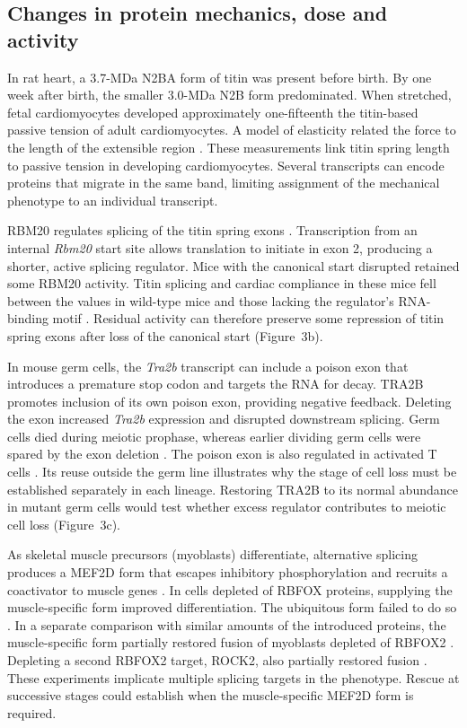 \documentclass[11pt,a4paper]{article}
\begin{document}
\subsection{Changes in protein mechanics, dose and activity}

In rat heart, a 3.7-MDa N2BA form of titin was present before birth. By one week after birth, the smaller 3.0-MDa N2B form predominated. When stretched, fetal cardiomyocytes developed approximately one-fifteenth the titin-based passive tension of adult cardiomyocytes. A model of elasticity related the force to the length of the extensible region \cite{Opitz2004}. These measurements link titin spring length to passive tension in developing cardiomyocytes. Several transcripts can encode proteins that migrate in the same band, limiting assignment of the mechanical phenotype to an individual transcript.

RBM20 regulates splicing of the titin spring exons \cite{Guo2012RBM20}. Transcription from an internal \textit{Rbm20} start site allows translation to initiate in exon 2, producing a shorter, active splicing regulator. Mice with the canonical start disrupted retained some RBM20 activity. Titin splicing and cardiac compliance in these mice fell between the values in wild-type mice and those lacking the regulator's RNA-binding motif \cite{Radke2026}. Residual activity can therefore preserve some repression of titin spring exons after loss of the canonical start (Figure~3b).

In mouse germ cells, the \textit{Tra2b} transcript can include a poison exon that introduces a premature stop codon and targets the RNA for decay. TRA2B promotes inclusion of its own poison exon, providing negative feedback. Deleting the exon increased \textit{Tra2b} expression and disrupted downstream splicing. Germ cells died during meiotic prophase, whereas earlier dividing germ cells were spared by the exon deletion \cite{Dalgliesh2025}. The poison exon is also regulated in activated T cells \cite{Karginov2024}. Its reuse outside the germ line illustrates why the stage of cell loss must be established separately in each lineage. Restoring TRA2B to its normal abundance in mutant germ cells would test whether excess regulator contributes to meiotic cell loss (Figure~3c).

As skeletal muscle precursors (myoblasts) differentiate, alternative splicing produces a MEF2D form that escapes inhibitory phosphorylation and recruits a coactivator to muscle genes \cite{Sebastian2013}. In cells depleted of RBFOX proteins, supplying the muscle-specific form improved differentiation. The ubiquitous form failed to do so \cite{Runfola2015}. In a separate comparison with similar amounts of the introduced proteins, the muscle-specific form partially restored fusion of myoblasts depleted of RBFOX2 \cite{Singh2014}. Depleting a second RBFOX2 target, ROCK2, also partially restored fusion \cite{Singh2014}. These experiments implicate multiple splicing targets in the phenotype. Rescue at successive stages could establish when the muscle-specific MEF2D form is required.
\end{document}
